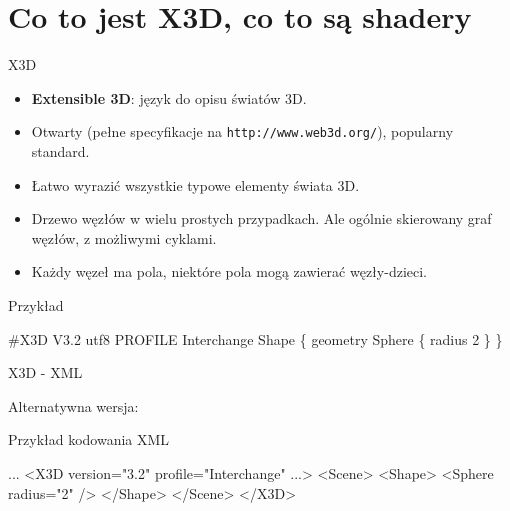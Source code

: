 \documentclass{beamer}
\begin{document}
\section{Co to jest X3D, co to są shadery}

\begin{frame}[fragile]{X3D}

\begin{itemize}
  \item \textbf{Extensible 3D}: język do opisu światów 3D.
  \item Otwarty (pełne specyfikacje na \texttt{http://www.web3d.org/}), popularny standard.
  \item Łatwo wyrazić wszystkie typowe elementy świata 3D.
  \item Drzewo węzłów w wielu prostych przypadkach.
    Ale ogólnie skierowany graf węzłów, z możliwymi cyklami.
  \item Każdy węzeł ma pola, niektóre pola mogą zawierać węzły-dzieci.
\end{itemize}

\begin{exampleblock}{Przykład}
\begin{semiverbatim}
\#X3D V3.2 utf8
PROFILE Interchange
Shape \{
  geometry Sphere \{ radius 2 \}
\}
\end{semiverbatim}
\end{exampleblock}
\end{frame}

\begin{frame}[fragile]{X3D - XML}

Alternatywna wersja:

\begin{exampleblock}{Przykład kodowania XML}
\begin{semiverbatim}
...
<X3D version="3.2" profile="Interchange" ...>
  <Scene>
    <Shape>
      <Sphere radius="2" />
    </Shape>
  </Scene>
</X3D>
\end{semiverbatim}
\end{exampleblock}

\end{frame}
\end{document}
